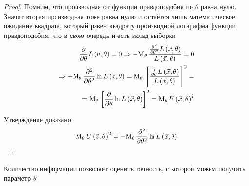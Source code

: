 \begin{proof}
    Помним, что производная от функции правдоподобия по $\theta$ равна нулю.
    Значит вторая производная тоже равна нулю
    и остаётся лишь математическое ожидание квадрата,
    который равен квадрату производной логарифма функции правдоподобия,
    что в свою очередь и есть вклад выборки
    \begin{align*}
        \frac{\partial}{\partial\theta}L\left( \vec{u},\theta \right)=0
        \Rightarrow
            -\mathrm{M}_{\theta}\,
            \frac{\frac{\partial^2}{\partial\theta^2}
                L\left(\vec{x},\theta\right)}
                {L\left(\vec{x},\theta\right)}=0\\
        \Rightarrow
            -\mathrm{M}_{\theta}\,
            \frac{\partial^2}{\partial\theta^2}
            \ln{L\left( \vec{x},\theta \right)}
            =\mathrm{M}_{\theta}\,
                \left[\frac{\frac{\partial}{\partial\theta}
                    L\left(\vec{x},\theta\right)}
                    {L\left(\vec{x},\theta\right)}\right]^2=\\
            =\mathrm{M}_{\theta}\,\left[
            \frac{\partial}{\partial\theta}
            \ln{L\left( \vec{x},\theta \right)}\right]^2
            =\mathrm{M}_{\theta}\,U\left( \vec{x},\theta \right)^2
    \end{align*}

    Утверждение доказано
    $$\mathrm{M}_{\theta}\,U\left( \vec{x},\theta \right)^2
        =-\mathrm{M}_{\theta}\,
            \frac{\partial^2}{\partial\theta^2}
            \ln{L\left( \vec{x},\theta \right)}$$
\end{proof}

Количество информации позволяет оценить точность,
с которой можем получить параметр $\theta$

